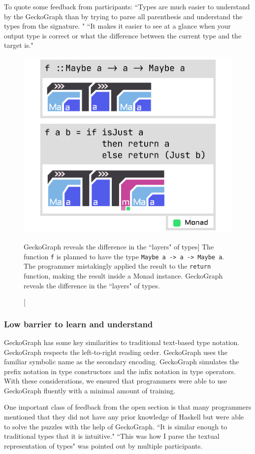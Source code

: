 To quote some feedback from participants: ``Types are much easier to understand by the GeckoGraph than by trying to parse all parenthesis and understand the types from the signature. " ``It makes it easier to see at a glance when your output type is correct or what the difference between the current type and the target is."
	
\begin{figure}[hbt]
  \includegraphics[width=0.6\linewidth]{figures/Maybe}
  \caption[GeckoGraph reveals the difference in the ``layers" of types]{\label{fig:maybe} The function \texttt{f} is planned to have the type \texttt{Maybe a -> a -> Maybe a}. The programmer mistakingly applied the result to the \texttt{return} function, making the result inside a Monad instance.  GeckoGraph reveals the difference in the ``layers" of types. }
\end{figure}


\subsubsection{Low barrier to learn and understand}
GeckoGraph has some key similarities to traditional text-based type notation. GeckoGraph respects the left-to-right reading order. GeckoGraph uses the familiar symbolic name as the secondary encoding. GeckoGraph simulates the prefix notation in type constructors and the infix notation in type operators. With these considerations, we ensured that programmers were able to use GeckoGraph fluently with a minimal amount of training. 

One important class of feedback from the open section is that many programmers mentioned that they did not have any prior knowledge of Haskell but were able to solve the puzzles with the help of GeckoGraph.
``It is similar enough to traditional types that it is intuitive." ``This was how I parse the textual representation of types" was pointed out by multiple participants.

